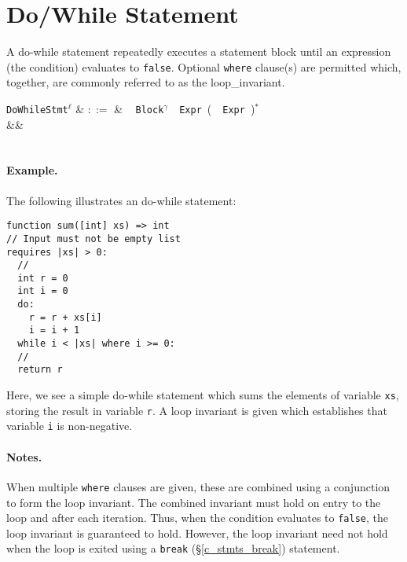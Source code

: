 \section{Do/While Statement}
\label{c_stmts_do_while}
A do-while statement repeatedly executes a statement block until an expression (the condition) evaluates to \lstinline{false}.  Optional \lstinline{where} clause(s) are permitted which, together, are commonly referred to as the \gls{loop_invariant}.  

\begin{syntax}
  \verb+DoWhileStmt+$^\ell$ & $::=$ & \ \token{:}
  \verb+Block+$^\gamma$\ \ \verb+Expr+\ \big(\
  \ \verb+Expr+\ \big)$^*$\\
&&\\
\\
\end{syntax}

\paragraph{Example.} The following illustrates an do-while statement:

\begin{lstlisting}
function sum([int] xs) => int
// Input must not be empty list
requires |xs| > 0:
  //
  int r = 0
  int i = 0
  do:
    r = r + xs[i]
    i = i + 1
  while i < |xs| where i >= 0:
  //
  return r
\end{lstlisting}
Here, we see a simple do-while statement which sums the elements of variable \lstinline{xs}, storing the result in variable \lstinline{r}.  A loop invariant is given which establishes that variable \lstinline{i} is non-negative.

\paragraph{Notes.}   When multiple \lstinline{where} clauses are given, these are combined using a conjunction to form the loop invariant.  The combined invariant must hold on entry to the loop and after each iteration.  Thus, when the condition evaluates to \lstinline{false}, the loop invariant is guaranteed to hold.  However, the loop invariant need not hold when the loop is exited using a \lstinline{break} (\S\ref{c_stmts_break}) statement.


